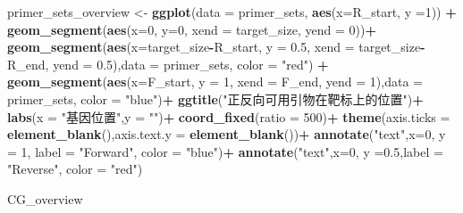 \documentclass[
]{article}
\newenvironment{Shaded}{\begin{snugshade}}{\end{snugshade}}
\newcommand{\AttributeTok}[1]{\textcolor[rgb]{0.13,0.29,0.53}{#1}}
\newcommand{\DecValTok}[1]{\textcolor[rgb]{0.00,0.00,0.81}{#1}}
\newcommand{\FloatTok}[1]{\textcolor[rgb]{0.00,0.00,0.81}{#1}}
\newcommand{\FunctionTok}[1]{\textcolor[rgb]{0.13,0.29,0.53}{\textbf{#1}}}
\newcommand{\NormalTok}[1]{#1}
\newcommand{\OtherTok}[1]{\textcolor[rgb]{0.56,0.35,0.01}{#1}}
\newcommand{\SpecialCharTok}[1]{\textcolor[rgb]{0.81,0.36,0.00}{\textbf{#1}}}
\newcommand{\StringTok}[1]{\textcolor[rgb]{0.31,0.60,0.02}{#1}}
\begin{document}
\begin{Shaded}
\begin{Highlighting}[]
\NormalTok{primer\_sets\_overview }\OtherTok{\textless{}{-}} 
  \FunctionTok{ggplot}\NormalTok{(}\AttributeTok{data =}\NormalTok{ primer\_sets, }\FunctionTok{aes}\NormalTok{(}\AttributeTok{x=}\NormalTok{R\_start, }\AttributeTok{y =}\DecValTok{1}\NormalTok{)) }\SpecialCharTok{+}
  \FunctionTok{geom\_segment}\NormalTok{(}\FunctionTok{aes}\NormalTok{(}\AttributeTok{x=}\DecValTok{0}\NormalTok{, }\AttributeTok{y=}\DecValTok{0}\NormalTok{, }\AttributeTok{xend =}\NormalTok{ target\_size, }\AttributeTok{yend =} \DecValTok{0}\NormalTok{))}\SpecialCharTok{+}
  \FunctionTok{geom\_segment}\NormalTok{(}\FunctionTok{aes}\NormalTok{(}\AttributeTok{x=}\NormalTok{target\_size}\SpecialCharTok{{-}}\NormalTok{R\_start, }\AttributeTok{y =} \FloatTok{0.5}\NormalTok{, }\AttributeTok{xend =}\NormalTok{ target\_size}\SpecialCharTok{{-}}\NormalTok{R\_end, }\AttributeTok{yend =} \FloatTok{0.5}\NormalTok{),}\AttributeTok{data =}\NormalTok{ primer\_sets, }\AttributeTok{color =} \StringTok{"red"}\NormalTok{) }\SpecialCharTok{+}
  \FunctionTok{geom\_segment}\NormalTok{(}\FunctionTok{aes}\NormalTok{(}\AttributeTok{x=}\NormalTok{F\_start, }\AttributeTok{y =} \DecValTok{1}\NormalTok{, }\AttributeTok{xend =}\NormalTok{ F\_end, }\AttributeTok{yend =} \DecValTok{1}\NormalTok{),}\AttributeTok{data =}\NormalTok{ primer\_sets, }\AttributeTok{color =} \StringTok{"blue"}\NormalTok{)}\SpecialCharTok{+}
  \FunctionTok{ggtitle}\NormalTok{(}\StringTok{"正反向可用引物在靶标上的位置"}\NormalTok{)}\SpecialCharTok{+}
  \FunctionTok{labs}\NormalTok{(}\AttributeTok{x =} \StringTok{"基因位置"}\NormalTok{,}\AttributeTok{y =} \StringTok{""}\NormalTok{)}\SpecialCharTok{+}
  \FunctionTok{coord\_fixed}\NormalTok{(}\AttributeTok{ratio =} \DecValTok{500}\NormalTok{)}\SpecialCharTok{+}
  \FunctionTok{theme}\NormalTok{(}\AttributeTok{axis.ticks =} \FunctionTok{element\_blank}\NormalTok{(),}\AttributeTok{axis.text.y =} \FunctionTok{element\_blank}\NormalTok{())}\SpecialCharTok{+}
  \FunctionTok{annotate}\NormalTok{(}\StringTok{"text"}\NormalTok{,}\AttributeTok{x=}\DecValTok{0}\NormalTok{, }\AttributeTok{y =} \DecValTok{1}\NormalTok{, }\AttributeTok{label =} \StringTok{"Forward"}\NormalTok{, }\AttributeTok{color =} \StringTok{"blue"}\NormalTok{)}\SpecialCharTok{+}
  \FunctionTok{annotate}\NormalTok{(}\StringTok{"text"}\NormalTok{,}\AttributeTok{x=}\DecValTok{0}\NormalTok{, }\AttributeTok{y =}\FloatTok{0.5}\NormalTok{,}\AttributeTok{label =} \StringTok{"Reverse"}\NormalTok{, }\AttributeTok{color =} \StringTok{"red"}\NormalTok{)}

\NormalTok{CG\_overview}
\end{Highlighting}
\end{Shaded}
\end{document}
